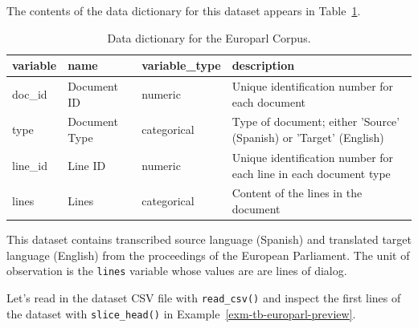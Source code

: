 \documentclass[
  letterpaper,
  DIV=11,
  numbers=noendperiod]{scrreport}
\theoremstyle{definition}
\theoremstyle{remark}
\begin{document}
The contents of the data dictionary for this dataset appears in
Table~\ref{tbl-td-europarl-dd}.

\hypertarget{tbl-td-europarl-dd}{}
\begin{table}
\caption{\label{tbl-td-europarl-dd}Data dictionary for the Europarl Corpus. }\tabularnewline

\centering
\begin{tabular}{l|l|l|l}
\hline
variable & name & variable\_type & description\\
\hline
doc\_id & Document ID & numeric & Unique identification number for each document\\
\hline
type & Document Type & categorical & Type of document; either 'Source' (Spanish) or 'Target' (English)\\
\hline
line\_id & Line ID & numeric & Unique identification number for each line in each document type\\
\hline
lines & Lines & categorical & Content of the lines in the document\\
\hline
\end{tabular}
\end{table}

This dataset contains transcribed source language (Spanish) and
translated target language (English) from the proceedings of the
European Parliament. The unit of observation is the \texttt{lines}
variable whose values are are lines of dialog.

Let's read in the dataset CSV file with \texttt{read\_csv()} and inspect
the first lines of the dataset with \texttt{slice\_head()} in
Example~\ref{exm-tb-europarl-preview}.
\end{document}
